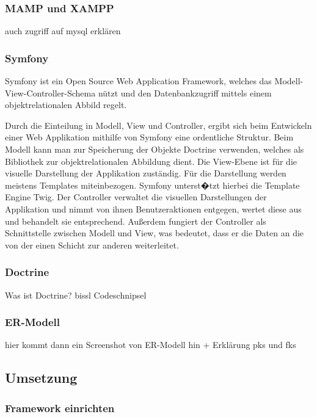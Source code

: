     \subsubsection{MAMP und XAMPP}

auch zugriff auf mysql erklären

    \subsubsection{Symfony}
    
Symfony ist ein Open Source Web Application Framework, welches das Modell-View-Controller-Schema nützt und den Datenbankzugriff mittels einem objektrelationalen Abbild regelt. 

Durch die Einteilung in Modell, View und Controller, ergibt sich beim Entwickeln einer Web Applikation mithilfe von Symfony eine ordentliche Struktur. 
Beim Modell kann man zur Speicherung der Objekte Doctrine verwenden, welches als Bibliothek zur objektrelationalen Abbildung dient.
Die View-Ebene ist für die visuelle Darstellung der Applikation zuständig. Für die  Darstellung werden meistens Templates miteinbezogen. Symfony unterst�tzt hierbei die Template Engine Twig. 
Der Controller verwaltet die visuellen Darstellungen der Applikation und nimmt von ihnen Benutzeraktionen entgegen, wertet diese aus und behandelt sie entsprechend. Außerdem fungiert der Controller als Schnittstelle zwischen Modell und View, was bedeutet, dass er die Daten an die von der einen Schicht zur anderen weiterleitet.


    \subsubsection{Doctrine}

Was ist Doctrine?
bissl Codeschnipsel

    \subsubsection{ER-Modell}

hier kommt dann ein Screenshot von ER-Modell hin + Erklärung pks und fks

  \subsection{Umsetzung}
  
    \subsubsection{Framework einrichten}

